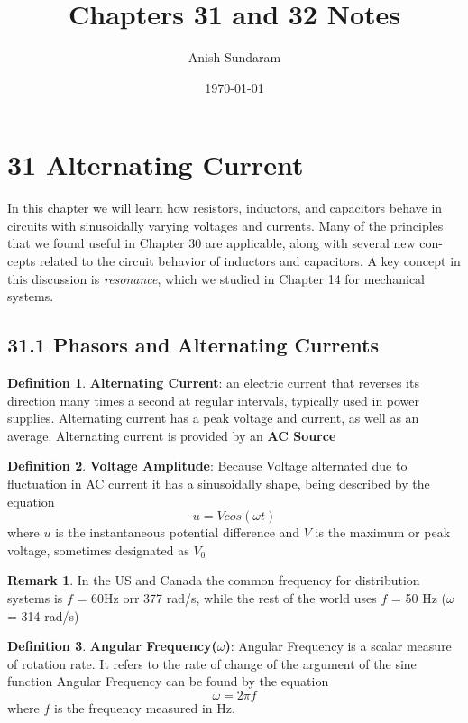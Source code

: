 \documentclass[12pt]{amsart}
\title{Chapters 31 and 32 Notes}
\author{Anish Sundaram}
\date{\today}
\theoremstyle{definition}
\newtheorem{definition}{Definition} %
\newtheorem*{remark}{Remark}        %
\numberwithin{equation}{theorem}    %
\begin{document}
\maketitle

\tableofcontents

\section*{31 Alternating Current}
In this chapter we will learn how resistors, inductors, and capacitors behave in circuits with sinusoidally varying voltages and currents. Many of the principles that we found useful in Chapter 30 are applicable, along with several new con- cepts related to the circuit behavior of inductors and capacitors. A key concept in this discussion is \textit{resonance}, which we studied in Chapter 14 for mechanical systems.


\subsection*{31.1 Phasors and Alternating Currents}

\begin{definition}
    \textbf{Alternating Current}:
    an electric current that reverses its direction many times a second at 
    regular intervals, typically used in power supplies. Alternating current has a peak voltage and current,
    as well as an average. Alternating current is provided by an \textbf{AC Source}
\end{definition}

\begin{definition}
    \textbf{Voltage Amplitude}:
    Because Voltage alternated due to fluctuation in AC current it has a sinusoidally
    shape, being described by the equation $$u = Vcos(\omega t)$$ where $u$ is the instantaneous
    potential difference and $V$ is the maximum or peak voltage, sometimes designated as $V_0$
    \begin{remark}
        In the US and Canada the common frequency for distribution systems is $f$ = 60Hz orr 377 rad/s, while
        the rest of the world uses $f$ = 50 Hz ($\omega$ = 314 rad/s)
    \end{remark}
\end{definition}

\begin{definition}
    \textbf{Angular Frequency($\omega$)}:
    Angular Frequency is a scalar measure of rotation rate. It refers to the rate of change of the argument of the sine function
    Angular Frequency can be found by the equation $$\omega = 2\pi f$$ where $f$ is the frequency measured in Hz.
\end{definition}
\end{document}
